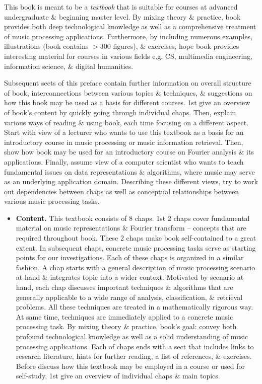 \documentclass{article}
\begin{document}
\begin{itemize}
	This book is meant to be a {\it textbook} that is suitable for courses at advanced undergraduate \& beginning master level. By mixing theory \& practice, book provides both deep technological knowledge as well as a comprehensive treatment of music processing applications. Furthermore, by including numerous examples, illustrations (book contains $> 300$ figures), \& exercises, hope book provides interesting material for courses in various fields e.g. CS, multimedia engineering, information science, \& digital humanities.
	
	Subsequent sects of this preface contain further information on overall structure of book, interconnections between various topics \& techniques, \& suggestions on how this book may be used as a basis for different courses. 1st give an overview of book's content by quickly going through individual chaps. Then, explain various ways of reading \& using book, each time focusing on a different aspect. Start with view of a lecturer who wants to use this textbook as a basis for an introductory course in music processing or music information retrieval. Then, show how book may be used for an introductory course on Fourier analysis \& its applications. Finally, assume view of a computer scientist who wants to teach fundamental issues on data representations \& algorithms, where music may serve as an underlying application domain. Describing these different views, try to work out dependencies between chaps as well as conceptual relationships between various music processing tasks.
	\begin{itemize}
		\item {\bf Content.} This textbook consists of 8 chaps. 1st 2 chaps cover fundamental material on music representations \& Fourier transform -- concepts that are required throughout book. These 2 chaps make book self-contained to a great extent. In subsequent chaps, concrete music processing tasks serve as starting points for our investigations. Each of these chaps is organized in a similar fashion. A chap starts with a general description of music processing scenario at hand \& integrates topic into a wider context. Motivated by scenario at hand, each chap discusses important techniques \& algorithms that are generally applicable to a wide range of analysis, classification, \& retrieval problems. All these techniques are treated in a mathematically rigorous way. At same time, techniques are immediately applied to a concrete music processing task. By mixing theory \& practice, book's goal: convey both profound technological knowledge as well as a solid understanding of music processing applications. Each of chaps ends with a sect that includes links to research literature, hints for further reading, a list of references, \& exercises. Before discuss how this textbook may be employed in a course or used for self-study, 1st give an overview of individual chaps \& main topics.
		

\end{itemize}
\end{itemize}
\end{document}
